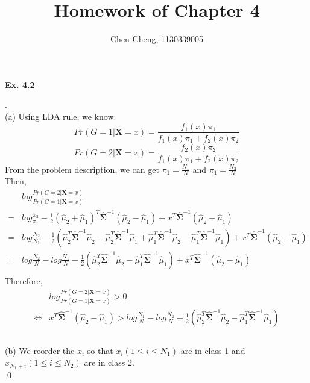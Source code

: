 \documentclass[12pt]{article}
\newenvironment{sol}
  {\par\vspace{3mm}\noindent{\it Solution}.}
  {\qed}
\begin{document}
\author{Chen Cheng, 1130339005}
\title{Homework of Chapter 4}
\maketitle

\begin{flushleft}
\textbf{Ex. 4.2}
\end{flushleft}
\begin{sol}
\\
(a) Using LDA rule, we know:
$$Pr(G=1|\mathbf{X}=x)=\frac{f_1(x)\pi_1}{f_1(x)\pi_1+f_2(x)\pi_2}$$
$$Pr(G=2|\mathbf{X}=x)=\frac{f_2(x)\pi_2}{f_1(x)\pi_1+f_2(x)\pi_2}$$
From the problem description, we can get $\pi_1=\frac{N_1}{N}$ and $\pi_1=\frac{N_2}{N}$\\
Then,
\begin{equation*}
\begin{split}
&log\frac{Pr(G=2|\mathbf{X}=x)}{Pr(G=1|\mathbf{X}=x)}\\
= &log\frac{\pi_2}{\pi_1}-\frac{1}{2}(\hat{\mu}_2+\hat{\mu}_1)^T\hat{\mathbf\Sigma}^{-1}(\hat{\mu}_2-\hat{\mu}_1)+x^T\hat{\mathbf\Sigma}^{-1}(\hat{\mu}_2-\hat{\mu}_1)\\
= &log\frac{N_2}{N_1}-\frac{1}{2}(\hat{\mu}_2^T\hat{\mathbf\Sigma}^{-1}\hat{\mu}_2-\hat{\mu}_2^T\hat{\mathbf\Sigma}^{-1}\hat{\mu}_1+\hat{\mu}_1^T\hat{\mathbf\Sigma}^{-1}\hat{\mu}_2
-\hat{\mu}_1^T\hat{\mathbf\Sigma}^{-1}\hat{\mu}_1)+x^T\hat{\mathbf\Sigma}^{-1}(\hat{\mu}_2-\hat{\mu}_1)\\
= &log\frac{N_2}{N}-log\frac{N_1}{N}-\frac{1}{2}(\hat{\mu}_2^T\hat{\mathbf\Sigma}^{-1}\hat{\mu}_2
-\hat{\mu}_1^T\hat{\mathbf\Sigma}^{-1}\hat{\mu}_1)+x^T\hat{\mathbf\Sigma}^{-1}(\hat{\mu}_2-\hat{\mu}_1)\\
\end{split}
\end{equation*}
Therefore,
\begin{equation*}
\begin{split}
&log\frac{Pr(G=2|\mathbf{X}=x)}{Pr(G=1|\mathbf{X}=x)}>0\\
\Leftrightarrow &x^T\hat{\mathbf\Sigma}^{-1}(\hat{\mu}_2-\hat{\mu}_1)>log\frac{N_1}{N}-log\frac{N_2}{N}+\frac{1}{2}(\hat{\mu}_2^T\hat{\mathbf\Sigma}^{-1}\hat{\mu}_2
-\hat{\mu}_1^T\hat{\mathbf\Sigma}^{-1}\hat{\mu}_1)\\
\end{split}
\end{equation*}
\\
(b) We reorder the $x_i$ so that $x_i(1\leq i \leq N_1)$ are in class 1 and $x_{N_1+i}(1 \leq i \leq N_2)$ are in class 2.\\

\end{sol}
\end{document}
